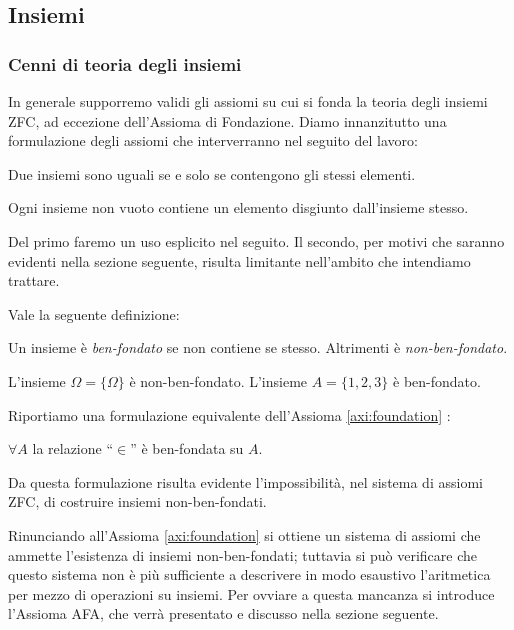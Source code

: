 \subsection{Insiemi}
\subsubsection{Cenni di teoria degli insiemi}
In generale supporremo validi gli assiomi su cui si fonda la teoria degli insiemi ZFC, ad eccezione dell'Assioma di Fondazione. Diamo innanzitutto una formulazione degli assiomi che interverranno nel seguito del lavoro:
\begin{axiom}[di estensionalità]
    Due insiemi sono uguali se e solo se contengono gli stessi elementi.
\end{axiom}

\begin{axiom}[di fondazione]
    Ogni insieme non vuoto contiene un elemento disgiunto dall'insieme stesso.
    \label{axi:foundation}
\end{axiom}
Del primo faremo un uso esplicito nel seguito. Il secondo, per motivi che saranno evidenti nella sezione seguente, risulta limitante nell'ambito che intendiamo trattare.

Vale la seguente definizione:
\begin{definition}
    Un insieme è \emph{ben-fondato} se non contiene se stesso. Altrimenti è \emph{non-ben-fondato}.
\end{definition}

\begin{example}
    L'insieme $\Omega = \{\Omega\}$ è non-ben-fondato. L'insieme $A = \{1,2,3\}$ è ben-fondato.
\end{example}

Riportiamo una formulazione equivalente dell'Assioma \ref{axi:foundation} \cite[Chapter III.4]{kunen}:
\begin{axiom*}
    $\forall A$ la relazione ``$\in$'' è ben-fondata su $A$.
\end{axiom*}

Da questa formulazione risulta evidente l'impossibilità, nel sistema di assiomi ZFC, di costruire insiemi non-ben-fondati.

Rinunciando all'Assioma \ref{axi:foundation} si ottiene un sistema di assiomi che ammette l'esistenza di insiemi non-ben-fondati; tuttavia si può verificare che questo sistema non è più sufficiente a descrivere in modo esaustivo l'aritmetica per mezzo di operazioni su insiemi. Per ovviare a questa mancanza si introduce l'Assioma AFA, che verrà presentato e discusso nella sezione seguente.

